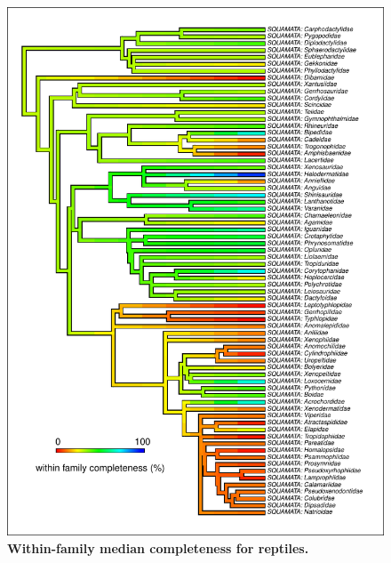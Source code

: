 \documentclass[11pt]{article}
\begin{document}
\pagebreak

\begin{figure}[h!]
\centering
\includegraphics[scale=1.2]{figures/NA_phylo_patterns/Reptiles_completeness}
\caption[Within-family median completeness for reptiles]{\textbf{Within-family median completeness for reptiles.}}
\label{}
\end{figure}



\clearpage
\end{document}
